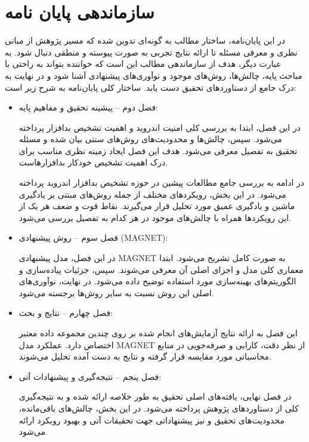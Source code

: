 \section{سازماندهی پایان نامه}\label{organiz}
در این پایان‌نامه، ساختار مطالب به گونه‌ای تدوین شده که مسیر پژوهش از مبانی نظری و معرفی مسئله تا ارائه نتایج تجربی به صورت پیوسته و منطقی دنبال شود. به عبارت دیگر، هدف از سازماندهی مطالب این است که خواننده بتواند به راحتی با مباحث پایه، چالش‌ها، روش‌های موجود و نوآوری‌های پیشنهادی آشنا شود و در نهایت به درک جامع از دستاوردهای تحقیق دست یابد. ساختار کلی پایان‌نامه به شرح زیر است:
\begin{itemize}
    \item فصل دوم – پیشینه تحقیق و مفاهیم پایه:
    
    در این فصل، ابتدا به بررسی کلی امنیت اندروید و اهمیت تشخیص بدافزار پرداخته می‌شود. سپس، چالش‌ها و محدودیت‌های روش‌های سنتی بیان شده و مسئله تحقیق به تفصیل معرفی می‌شود. هدف این فصل ایجاد زمینه نظری مناسب برای درک اهمیت تشخیص خودکار بدافزارهاست.
    
    در ادامه به بررسی جامع مطالعات پیشین در حوزه تشخیص بدافزار اندروید پرداخته می‌شود. در این بخش، رویکردهای مختلف از جمله روش‌های مبتنی بر یادگیری ماشین و یادگیری عمیق مورد تحلیل قرار می‌گیرند. نقاط قوت و ضعف هر یک از این رویکردها همراه با چالش‌های موجود در هر کدام به تفصیل بررسی می‌شود.
    
    \item فصل سوم – روش پیشنهادی (MAGNET):
    
    در این فصل، مدل پیشنهادی MAGNET به صورت کامل تشریح می‌شود. ابتدا معماری کلی مدل و اجزای اصلی آن معرفی می‌شوند. سپس، جزئیات پیاده‌سازی و الگوریتم‌های بهینه‌سازی مورد استفاده توضیح داده می‌شود. در نهایت، نوآوری‌های اصلی این روش نسبت به سایر روش‌ها برجسته می‌شود.
    
    \item فصل چهارم – نتایج و بحث:
    
    این فصل به ارائه نتایج آزمایش‌های انجام شده بر روی چندین مجموعه داده معتبر اختصاص دارد. عملکرد مدل MAGNET از نظر دقت، کارایی و صرفه‌جویی در منابع محاسباتی مورد مقایسه قرار گرفته و نتایج به دست آمده تحلیل می‌شوند.
    
    \item فصل پنجم – نتیجه‌گیری و پیشنهادات آتی:
    
    در فصل نهایی، یافته‌های اصلی تحقیق به طور خلاصه ارائه شده و به نتیجه‌گیری کلی از دستاوردهای پژوهش پرداخته می‌شود. در این بخش، چالش‌های باقی‌مانده، محدودیت‌های تحقیق و نیز پیشنهاداتی جهت تحقیقات آتی و بهبود رویکرد ارائه می‌شود.
\end{itemize}



